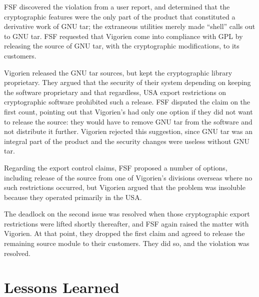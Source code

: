 \documentclass[12pt]{report}
\begin{document}
FSF discovered the violation from a user report, and determined that the
cryptographic features were the only part of the product that constituted
a derivative work of GNU tar; the extraneous utilities merely made
``shell'' calls out to GNU tar.  FSF requested that Vigorien come into
compliance with GPL by releasing the source of GNU tar, with the
cryptographic modifications, to its customers.

Vigorien released the GNU tar sources, but kept the cryptographic library
proprietary.  They argued that the security of their system depending on
keeping the software proprietary and that regardless, USA export
restrictions on cryptographic software prohibited such a release.  FSF
disputed the claim on the first count, pointing out that Vigorien's had
only one option if they did not want to release the source: they would
have to remove GNU tar from the software and not distribute it further.
Vigorien rejected this suggestion, since GNU tar was an integral part of
the product and the security changes were useless without GNU tar.

Regarding the export control claims, FSF proposed a number of options,
including release of the source from one of Vigorien's divisions overseas
where no such restrictions occurred, but Vigorien argued that the problem
was insoluble because they operated primarily in the USA\@.

The deadlock on the second issue was resolved when those cryptographic
export restrictions were lifted shortly thereafter, and FSF again raised
the matter with Vigorien.  At that point, they dropped the first claim and
agreed to release the remaining source module to their customers.  They
did so, and the violation was resolved.


\section{Lessons Learned}
\end{document}
